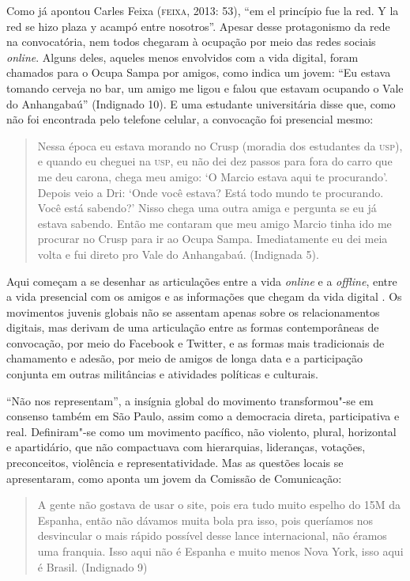 Como já apontou Carles Feixa (\textsc{feixa}, 2013: 53), ``em el princípio fue la
red. Y la red se hizo plaza y acampó entre nosotros''. Apesar desse
protagonismo da rede na convocatória, nem todos chegaram à ocupação por
meio das redes sociais \emph{online}. Alguns deles, aqueles menos
envolvidos com a vida digital, foram chamados para o Ocupa Sampa por
amigos, como indica um jovem: ``Eu estava tomando cerveja no bar, um
amigo me ligou e falou que estavam ocupando o Vale do Anhangabaú''
(Indignado 10). E uma estudante universitária disse que, como não foi
encontrada pelo telefone celular, a convocação foi presencial mesmo:

\begin{quote}
Nessa época eu estava morando no Crusp (moradia dos estudantes da \textsc{usp}),
e quando eu cheguei na \textsc{usp}, eu não dei dez passos para fora do carro que
me deu carona, chega meu amigo: `O Marcio estava aqui te procurando'.
Depois veio a Dri: `Onde você estava? Está todo mundo te procurando.
Você está sabendo?' Nisso chega uma outra amiga e pergunta se eu já
estava sabendo. Então me contaram que meu amigo Marcio tinha ido me
procurar no Crusp para ir ao Ocupa Sampa. Imediatamente eu dei meia
volta e fui direto pro Vale do Anhangabaú. (Indignada 5).
\end{quote}

Aqui começam a se desenhar as articulações entre a vida \emph{online} e
a \emph{offline}, entre a vida presencial com os amigos e as
informações que chegam da vida digital . Os movimentos juvenis globais
não se assentam apenas sobre os relacionamentos digitais, mas derivam de
uma articulação entre as formas contemporâneas de convocação, por meio
do Facebook e Twitter, e as formas mais tradicionais de chamamento e
adesão, por meio de amigos de longa data e a participação conjunta em
outras militâncias e atividades políticas e culturais.

``Não nos representam'', a insígnia global do movimento transformou"-se
em consenso também em São Paulo, assim como a democracia direta,
participativa e real. Definiram"-se como um movimento pacífico, não
violento, plural, horizontal e apartidário, que não compactuava com
hierarquias, lideranças, votações, preconceitos, violência e
representatividade. Mas as questões locais se apresentaram, como aponta
um jovem da Comissão de Comunicação:

\begin{quote}
A gente não gostava de usar o site, pois era tudo muito espelho do 15M
da Espanha, então não dávamos muita bola pra isso, pois queríamos nos
desvincular o mais rápido possível desse lance internacional, não éramos
uma franquia. Isso aqui não é Espanha e muito menos Nova York, isso aqui
é Brasil. (Indignado 9)
\end{quote}

